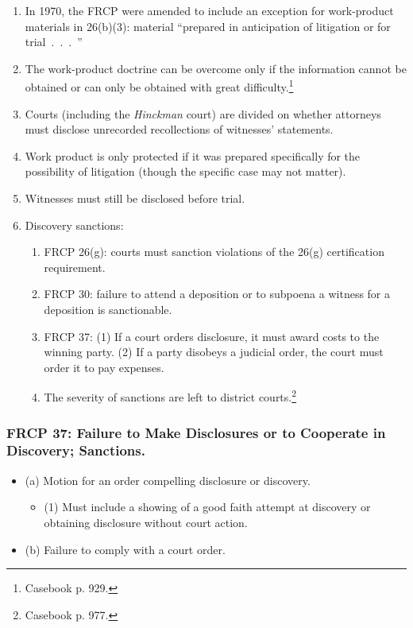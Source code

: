 \begin{enumerate}
    \item In 1970, the FRCP were amended to include an exception for 
    work-product materials in 26(b)(3): material ``prepared in anticipation of 
    litigation or for trial~.~.~.~''
    \item The work-product doctrine can be overcome only if the information 
    cannot be obtained or can only be obtained with great 
    difficulty.\footnote{Casebook p. 929.}
    \item Courts (including the \emph{Hinckman} court) are divided on whether 
    attorneys must disclose unrecorded recollections of witnesses' statements.
    \item Work product is only protected if it was prepared specifically for 
    the possibility of litigation (though the specific case may not matter).
    \item Witnesses must still be disclosed before trial.
    \item Discovery sanctions:
    \begin{enumerate}
        \item FRCP 26(g): courts must sanction violations of the 26(g) 
        certification requirement.
        \item FRCP 30: failure to attend a deposition or to subpoena a witness 
        for a deposition is sanctionable.
        \item FRCP 37: (1) If a court orders disclosure, it must award costs 
        to the winning party. (2) If a party disobeys a judicial order, the 
        court must order it to pay expenses.
        \item The severity of sanctions are left to district 
        courts.\footnote{Casebook p. 977.}
    \end{enumerate}
\end{enumerate}

\subsubsection{FRCP 37: Failure to Make Disclosures or to Cooperate in 
Discovery; Sanctions.}

\begin{itemize}
    \item (a) Motion for an order compelling disclosure or discovery.
    \begin{itemize}
        \item (1) Must include a showing of a good faith attempt at discovery 
        or obtaining disclosure without court action.
    \end{itemize}
    \item (b) Failure to comply with a court order.
\end{itemize}
